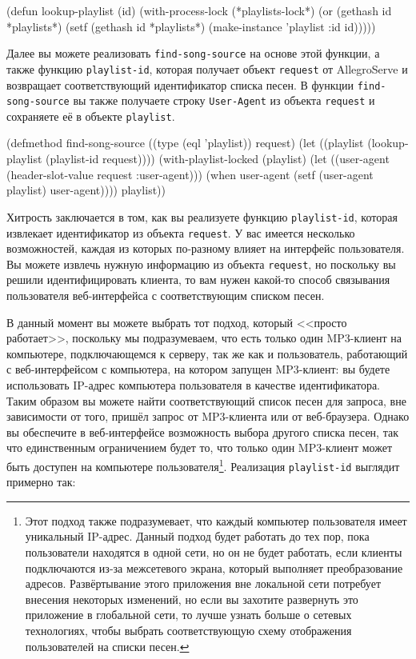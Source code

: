 \begin{myverb}
(defun lookup-playlist (id)
  (with-process-lock (*playlists-lock*)
    (or (gethash id *playlists*)
        (setf (gethash id *playlists*) (make-instance 'playlist :id id)))))
\end{myverb}

Далее вы можете реализовать \lstinline{find-song-source} на основе этой функции, а также
функцию \lstinline{playlist-id}, которая получает объект \lstinline{request} от AllegroServe и
возвращает соответствующий идентификатор списка песен.  В функции \lstinline{find-song-source}
вы также получаете строку \lstinline{User-Agent} из объекта \lstinline{request} и сохраняете её в
объекте \lstinline{playlist}.

\begin{myverb}
(defmethod find-song-source ((type (eql 'playlist)) request)
  (let ((playlist (lookup-playlist (playlist-id request))))
    (with-playlist-locked (playlist)
      (let ((user-agent (header-slot-value request :user-agent)))
        (when user-agent (setf (user-agent playlist) user-agent))))
    playlist))
\end{myverb}

Хитрость заключается в том, как вы реализуете функцию \lstinline{playlist-id}, которая
извлекает идентификатор из объекта \lstinline{request}.  У вас имеется несколько возможностей,
каждая из которых по-разному влияет на интерфейс пользователя.  Вы можете извлечь нужную
информацию из объекта \lstinline{request}, но поскольку вы решили идентифицировать клиента, то
вам нужен какой-то способ связывания пользователя веб-интерфейса с соответствующим списком
песен.

В данный момент вы можете выбрать тот подход, который <<просто работает>>, поскольку мы
подразумеваем, что есть только один MP3-клиент на компьютере, подключающемся к серверу,
так же как и пользователь, работающий с веб-интерфейсом с компьютера, на котором запущен
MP3-клиент: вы будете использовать IP-адрес компьютера пользователя в качестве
идентификатора.  Таким образом вы можете найти соответствующий список песен для запроса,
вне зависимости от того, пришёл запрос от MP3-клиента или от веб-браузера.  Однако вы
обеспечите в веб-интерфейсе возможность выбора другого списка песен, так что единственным
ограничением будет то, что только один MP3-клиент может быть доступен на компьютере
пользователя\footnote{Этот подход также подразумевает, что каждый компьютер пользователя
  имеет уникальный IP-адрес.  Данный подход будет работать до тех пор, пока пользователи
  находятся в одной сети, но он не будет работать, если клиенты подключаются из-за
  межсетевого экрана, который выполняет преобразование адресов.  Развёртывание этого
  приложения вне локальной сети потребует внесения некоторых изменений, но если вы
  захотите развернуть это приложение в глобальной сети, то лучше узнать больше о сетевых
  технологиях, чтобы выбрать соответствующую схему отображения пользователей на списки
  песен.}.  Реализация \lstinline{playlist-id} выглядит примерно так:

